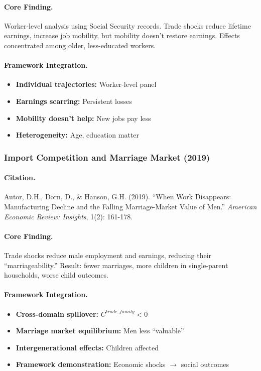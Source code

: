 \documentclass[12pt,a4paper]{article}
\begin{document}
\paragraph{Core Finding.}
Worker-level analysis using Social Security records. Trade shocks reduce
lifetime earnings, increase job mobility, but mobility doesn't restore
earnings. Effects concentrated among older, less-educated workers.

\paragraph{Framework Integration.}
\begin{itemize}
  \item \textbf{Individual trajectories:} Worker-level panel
  \item \textbf{Earnings scarring:} Persistent losses
  \item \textbf{Mobility doesn't help:} New jobs pay less
  \item \textbf{Heterogeneity:} Age, education matter
\end{itemize}

\subsubsection{Import Competition and Marriage Market (2019)}

\paragraph{Citation.}
Autor, D.H., Dorn, D., \& Hanson, G.H. (2019). ``When Work Disappears:
Manufacturing Decline and the Falling Marriage-Market Value of Men.''
\emph{American Economic Review: Insights}, 1(2): 161-178.

\paragraph{Core Finding.}
Trade shocks reduce male employment and earnings, reducing their
``marriageability.'' Result: fewer marriages, more children in
single-parent households, worse child outcomes.

\paragraph{Framework Integration.}
\begin{itemize}
  \item \textbf{Cross-domain spillover:} $C^{trade,family} < 0$
  \item \textbf{Marriage market equilibrium:} Men less ``valuable''
  \item \textbf{Intergenerational effects:} Children affected
  \item \textbf{Framework demonstration:} Economic shocks $\to$ social outcomes
\end{itemize}
\end{document}
